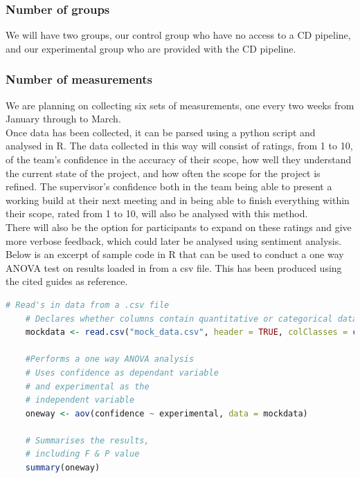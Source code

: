 \documentclass[journal]{IEEEtran}
\begin{document}
\subsubsection*{Number of groups}
We will have two groups, our control group who have no access to a CD pipeline, and our experimental group who are provided with the CD pipeline.\\

\subsubsection*{Number of measurements}
We are planning on collecting six sets of measurements, one every two weeks from January through to March.\\

Once data has been collected, it can be parsed using a python script and analysed in R. The data collected in this way will consist of ratings, from 1 to 10, of the team's confidence in the accuracy of their scope, how well they understand the current state of the project, and how often the scope for the project is refined. The supervisor's confidence both in the team being able to present a working build at their next meeting and in being able to finish everything within their scope, rated from 1 to 10, will also be analysed with this method.\\
There will also be the option for participants to expand on these ratings and give more verbose feedback, which could later be analysed using sentiment analysis\cite{altrabsheh2014sentiment}. \\
Below is an excerpt of sample code in R that can be used to conduct a one way ANOVA test on results loaded in from a csv file. This has been produced using the cited guides as reference\cite{Rtutone,Rtuttwo}.

\begin{lstlisting}[language=R, caption = Sample R code for performing a one way ANOVA on data imported from a csv file, captionpos = b]
    # Read's in data from a .csv file
    # Declares whether columns contain quantitative or categorical data
    mockdata <- read.csv("mock_data.csv", header = TRUE, colClasses = c("factor", "factor", "numeric"))

    #Performs a one way ANOVA analysis
    # Uses confidence as dependant variable
    # and experimental as the
    # independent variable
    oneway <- aov(confidence ~ experimental, data = mockdata)

    # Summarises the results,
    # including F & P value
    summary(oneway)
\end{lstlisting}
\end{document}
